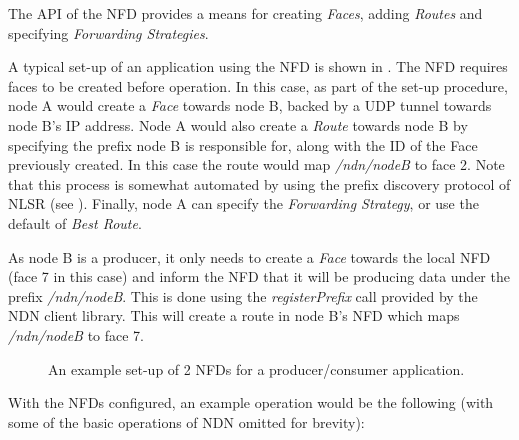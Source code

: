 The API of the NFD provides a means for creating \textit{Faces}, adding \textit{Routes} and specifying \textit{Forwarding Strategies}.
 
 A typical set-up of an application using the NFD is shown in . The NFD requires faces to be created before operation. In this case, as part of the set-up procedure, node A would create a \textit{Face} towards node B, backed by a UDP tunnel towards node B's IP address. Node A would also create a \textit{Route} towards node B by specifying the prefix node B is responsible for, along with the ID of the Face previously created. In this case the route would map \textit{/ndn/nodeB} to face 2. Note that this process is somewhat automated by using the prefix discovery protocol of NLSR (see ). Finally, node A can specify the \textit{Forwarding Strategy}, or use the default of \textit{Best Route}.


As node B is a producer, it only needs to create a \textit{Face} towards the local NFD (face 7 in this case) and inform the NFD that it will be producing data under the prefix \textit{/ndn/nodeB}. This is done using the  \textit{registerPrefix} call provided by the NDN client library. This will create a route in node B's NFD which maps \textit{/ndn/nodeB} to face 7.
\begin{figure}[H]
    \centering
    \caption{An example set-up of 2 NFDs for a producer/consumer application.}
    \label{fig:nfd-setup}
\end{figure}

With the NFDs configured, an example operation would be the following (with some of the basic operations of NDN omitted for brevity):

